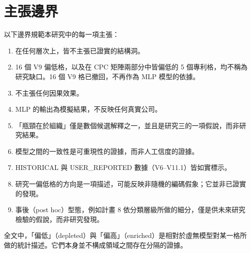 \section{主張邊界}
\label{zh:sec:design_boundaries}

以下邊界規範本研究中的每一項主張：
\begin{enumerate}
\item[(i)] 在任何層次上，皆不主張已證實的結構洞。
\item[(ii)] 16 個 V9 偏低格，以及在 CPC 矩陣兩部分中皆偏低的 5 個專利格，均不稱為研究缺口。16 個 V9 格已撤回，不再作為 MLP 模型的依據。
\item[(iii)] 不主張任何因果效果。
\item[(iv)] MLP 的輸出為模擬結果，不反映任何真實公司。
\item[(v)] 「瓶頸在於組織」僅是數個候選解釋之一，並且是研究三的一項假說，而非研究結果。
\item[(vi)] 模型之間的一致性是可重現性的證據，而非人工信度的證據。
\item[(vii)] HISTORICAL 與 USER\_\allowbreak REPORTED 數據（V6--V11.1）皆如實標示。
\item[(viii)] 研究一偏低格的方向是一項描述，可能反映非隨機的編碼假象；它並非已證實的發現。
\item[(ix)] 事後（post hoc）型態，例如計畫 8 依分類層級所做的細分，僅是供未來研究檢驗的假說，而非研究發現。
\end{enumerate}
全文中，「偏低」（depleted）與「偏高」（enriched）是相對於虛無模型對某一格所做的統計描述。它們本身並不構成領域之間存在分隔的證據。
